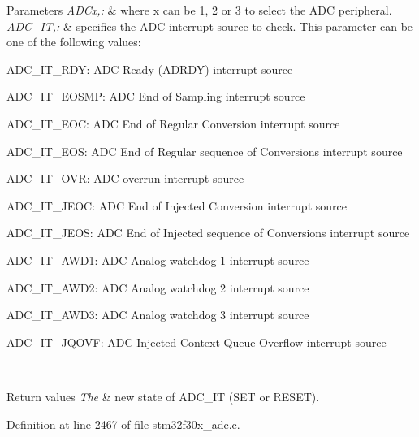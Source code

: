 \begin{DoxyParams}{Parameters}
{\em A\-D\-Cx,\-:} & where x can be 1, 2 or 3 to select the A\-D\-C peripheral. \\
\hline
{\em A\-D\-C\-\_\-\-I\-T,\-:} & specifies the A\-D\-C interrupt source to check. This parameter can be one of the following values\-: \begin{DoxyItemize}
\item A\-D\-C\-\_\-\-I\-T\-\_\-\-R\-D\-Y\-: A\-D\-C Ready (A\-D\-R\-D\-Y) interrupt source \item A\-D\-C\-\_\-\-I\-T\-\_\-\-E\-O\-S\-M\-P\-: A\-D\-C End of Sampling interrupt source \item A\-D\-C\-\_\-\-I\-T\-\_\-\-E\-O\-C\-: A\-D\-C End of Regular Conversion interrupt source \item A\-D\-C\-\_\-\-I\-T\-\_\-\-E\-O\-S\-: A\-D\-C End of Regular sequence of Conversions interrupt source \item A\-D\-C\-\_\-\-I\-T\-\_\-\-O\-V\-R\-: A\-D\-C overrun interrupt source \item A\-D\-C\-\_\-\-I\-T\-\_\-\-J\-E\-O\-C\-: A\-D\-C End of Injected Conversion interrupt source \item A\-D\-C\-\_\-\-I\-T\-\_\-\-J\-E\-O\-S\-: A\-D\-C End of Injected sequence of Conversions interrupt source \item A\-D\-C\-\_\-\-I\-T\-\_\-\-A\-W\-D1\-: A\-D\-C Analog watchdog 1 interrupt source \item A\-D\-C\-\_\-\-I\-T\-\_\-\-A\-W\-D2\-: A\-D\-C Analog watchdog 2 interrupt source \item A\-D\-C\-\_\-\-I\-T\-\_\-\-A\-W\-D3\-: A\-D\-C Analog watchdog 3 interrupt source \item A\-D\-C\-\_\-\-I\-T\-\_\-\-J\-Q\-O\-V\-F\-: A\-D\-C Injected Context Queue Overflow interrupt source \end{DoxyItemize}
\\
\hline
\end{DoxyParams}

\begin{DoxyRetVals}{Return values}
{\em The} & new state of A\-D\-C\-\_\-\-I\-T (S\-E\-T or R\-E\-S\-E\-T). \\
\hline
\end{DoxyRetVals}


Definition at line 2467 of file stm32f30x\-\_\-adc.\-c.


